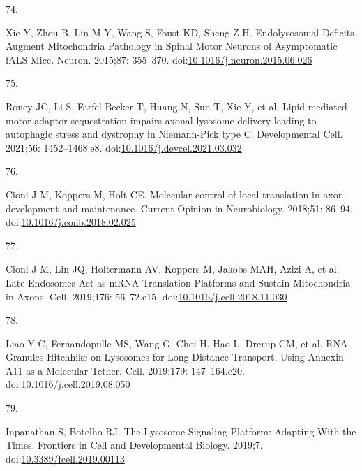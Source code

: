 \documentclass[
  12pt,
  a4paper,
]{book}
\newlength{\cslhangindent}
\newlength{\csllabelwidth}
\newlength{\cslentryspacingunit} %
\newenvironment{CSLReferences}[2] %
 {%
  \setlength{\parindent}{0pt}
  \ifodd #1
  \let\oldpar\par
  \def\par{\hangindent=\cslhangindent\oldpar}
  \fi
  \setlength{\parskip}{#2\cslentryspacingunit}
 }%
 {}
\newcommand{\CSLLeftMargin}[1]{\parbox[t]{\csllabelwidth}{#1}}
\newcommand{\CSLRightInline}[1]{\parbox[t]{\linewidth - \csllabelwidth}{#1}\break}
\begin{document}
\begin{CSLReferences}{0}{0}
\leavevmode{}%
\CSLLeftMargin{74. }%
\CSLRightInline{Xie Y, Zhou B, Lin M-Y, Wang S, Foust KD, Sheng Z-H. Endolysosomal {Deficits Augment Mitochondria Pathology} in {Spinal Motor Neurons} of {Asymptomatic fALS Mice}. Neuron. 2015;87: 355--370. doi:\href{https://doi.org/10.1016/j.neuron.2015.06.026}{10.1016/j.neuron.2015.06.026}}

\leavevmode{}%
\CSLLeftMargin{75. }%
\CSLRightInline{Roney JC, Li S, Farfel-Becker T, Huang N, Sun T, Xie Y, et al. Lipid-mediated motor-adaptor sequestration impairs axonal lysosome delivery leading to autophagic stress and dystrophy in {Niemann-Pick} type {C}. Developmental Cell. 2021;56: 1452--1468.e8. doi:\href{https://doi.org/10.1016/j.devcel.2021.03.032}{10.1016/j.devcel.2021.03.032}}

\leavevmode{}%
\CSLLeftMargin{76. }%
\CSLRightInline{Cioni J-M, Koppers M, Holt CE. Molecular control of local translation in axon development and maintenance. Current Opinion in Neurobiology. 2018;51: 86--94. doi:\href{https://doi.org/10.1016/j.conb.2018.02.025}{10.1016/j.conb.2018.02.025}}

\leavevmode{}%
\CSLLeftMargin{77. }%
\CSLRightInline{Cioni J-M, Lin JQ, Holtermann AV, Koppers M, Jakobs MAH, Azizi A, et al. Late {Endosomes Act} as {mRNA Translation Platforms} and {Sustain Mitochondria} in {Axons}. Cell. 2019;176: 56--72.e15. doi:\href{https://doi.org/10.1016/j.cell.2018.11.030}{10.1016/j.cell.2018.11.030}}

\leavevmode{}%
\CSLLeftMargin{78. }%
\CSLRightInline{Liao Y-C, Fernandopulle MS, Wang G, Choi H, Hao L, Drerup CM, et al. {RNA Granules Hitchhike} on {Lysosomes} for {Long-Distance Transport}, {Using Annexin A11} as a {Molecular Tether}. Cell. 2019;179: 147--164.e20. doi:\href{https://doi.org/10.1016/j.cell.2019.08.050}{10.1016/j.cell.2019.08.050}}

\leavevmode{}%
\CSLLeftMargin{79. }%
\CSLRightInline{Inpanathan S, Botelho RJ. The {Lysosome Signaling Platform}: {Adapting With} the {Times}. Frontiers in Cell and Developmental Biology. 2019;7. doi:\href{https://doi.org/10.3389/fcell.2019.00113}{10.3389/fcell.2019.00113}}


\end{CSLReferences}
\end{document}

